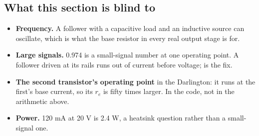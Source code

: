 \subsection{What this section is blind to}
\label{c8:sec:a7}
\begin{itemize}
  \item \textbf{Frequency.} A follower with a capacitive load and an inductive source can oscillate, which is what the base resistor in every real output stage is for.
  \item \textbf{Large signals.} 0.974 is a small-signal number at one operating point. A follower driven at its rails runs out of current before voltage;  is the fix.
  \item \textbf{The second transistor's operating point} in the Darlington: it runs at the first's base current, so its $r_e$ is fifty times larger. In the code, not in the arithmetic above.
  \item \textbf{Power.} 120 mA at 20 V is 2.4 W, a heatsink question rather than a small-signal one.
\end{itemize}
